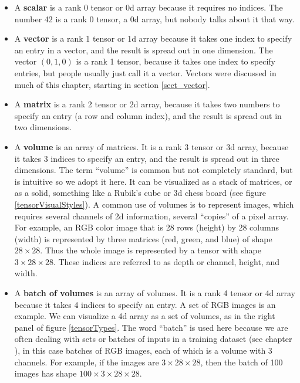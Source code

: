 \begin{itemize}
\item A \textbf{scalar} is a rank 0 tensor or 0d array because it requires no indices. The number 42 is a rank 0 tensor, a 0d array, but nobody talks about it that way. 
\item A \textbf{vector} is a rank 1 tensor or 1d array because it takes one index to specify an entry in a vector, and the result is spread out in one dimension. The vector $(0,1,0)$ is a rank 1 tensor, because it takes one index to specify entries, but people usually just call it a vector. Vectors were discussed in much of this chapter, starting in section \ref{sect_vector}.
\item A \textbf{matrix} is a rank 2 tensor or 2d array, because it takes two numbers to specify an entry (a row and column index), and the result is spread out in two dimensions. 
\item A \textbf{volume} is an array of matrices. It is a rank 3 tensor or 3d array, because it takes 3 indices to specify an entry, and the result is spread out in three dimensions. The term ``volume'' is common but not completely standard, but is intuitive so we adopt it here. It can be visualized as a stack of matrices, or as a solid, something like a Rubik's cube or 3d chess board (see figure \ref{tensorVisualStyles}). A common use of volumes is to represent images, which requires several channels of 2d information, several ``copies'' of a pixel array. For example, an RGB color image that is 28 rows (height) by 28 columns (width) is represented by three matrices (red, green, and blue) of shape $28 \times 28$. Thus the whole image is represented by a tensor with shape $3 \times 28 \times 28$. These indices are referred to as depth or channel, height, and width. 
\item A \textbf{batch of volumes} is an array of volumes. It is a rank 4 tensor or 4d array because it takes 4 indices to specify an entry. A set of RGB images is an example. We can visualize a 4d array as a set of volumes, as in the right panel of figure \ref{tensorTypes}. The word ``batch'' is used here because we are often dealing with sets or batches of inputs in a training dataset (see chapter ), in this case batches of RGB images, each of which is a volume with 3 channels. For example, if the images are $3 \times 28 \times 28$, then the batch of 100 images has shape $100 \times 3 \times 28 \times 28$. 
\end{itemize}


